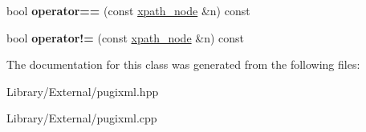 \begin{DoxyCompactItemize}
\item 
\hypertarget{classpugi_1_1xpath__node_ac41341c30e66880aad2a731203d9cf4b}{}bool {\bfseries operator==} (const \hyperlink{classpugi_1_1xpath__node}{xpath\+\_\+node} \&n) const \label{classpugi_1_1xpath__node_ac41341c30e66880aad2a731203d9cf4b}

\item 
\hypertarget{classpugi_1_1xpath__node_a785725ca60a15a9d2df83b91725105bd}{}bool {\bfseries operator!=} (const \hyperlink{classpugi_1_1xpath__node}{xpath\+\_\+node} \&n) const \label{classpugi_1_1xpath__node_a785725ca60a15a9d2df83b91725105bd}

\end{DoxyCompactItemize}


The documentation for this class was generated from the following files\+:\begin{DoxyCompactItemize}
\item 
Library/\+External/pugixml.\+hpp\item 
Library/\+External/pugixml.\+cpp\end{DoxyCompactItemize}
